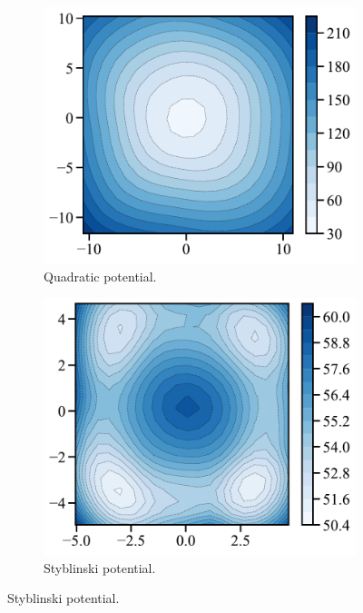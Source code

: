 \begin{figure}[t]
     \centering
     \begin{subfigure}[t]{0.21\textwidth}
         \centering
         \caption{Quadratic \protect\newline potential.}
         \includegraphics[width=\textwidth]{figures/fig_energy_implicit_quadratic.pdf}
     \end{subfigure}
     \hfill
     \begin{subfigure}[t]{0.21\textwidth}
         \centering
         \caption{Styblinski \protect\newline potential.}
         \includegraphics[width=\textwidth]{figures/fig_energy_implicit_styblinski.pdf}

\end{subfigure}
\end{figure}
